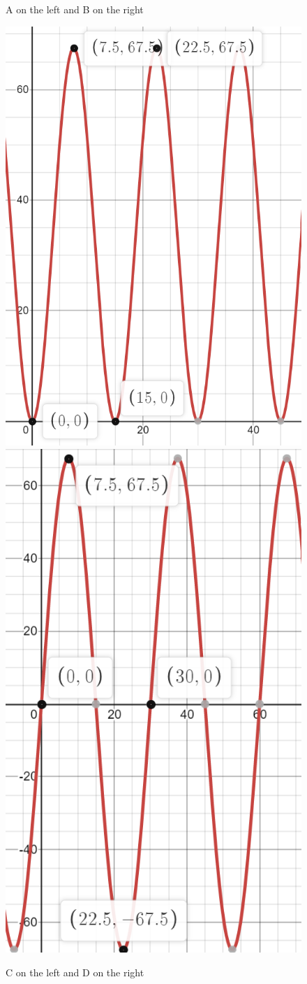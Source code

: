 \documentclass{ximera}
\begin{document}
\begin{exercise}
\begin{enumerate}
\begin{figure}[!h]
\begin{image}
\end{image}
\caption{A on the left and B on the right}
\end{figure}

\begin{figure}[!h]
\begin{image}
\includegraphics[width=.4\linewidth]{ex3-c.png}
\hspace{20mm}
\includegraphics[width=.4\linewidth]{ex3-d.png}
\end{image}
\caption{C on the left and D on the right}
\end{figure}

\begin{multipleChoice}
\end{multipleChoice}
\end{enumerate}

\end{exercise}
\end{document}
